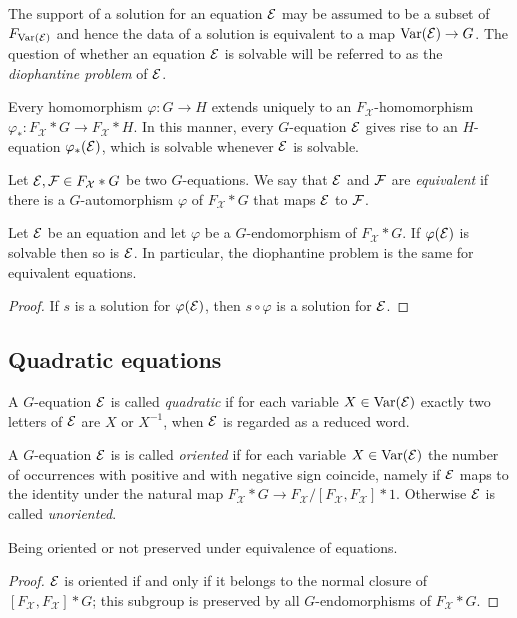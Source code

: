 \documentclass[a4paper,11pt]{amsart}
\begin{document}
The support of a solution for an equation $\mathcal{E}$ may be assumed to be
a subset of $F_{\textup{Var}(\mathcal{E})}$ and hence the data of a solution
is equivalent to a map $\textup{Var}(\mathcal{E}) \to G$.  The question of whether an
equation $\mathcal{E}$ is solvable will be referred to as the \emph{diophantine
problem} of $\mathcal{E}$.

Every homomorphism $\varphi \colon G \to H$ extends uniquely to an
$F_{\mathcal{X}}$-ho\-mo\-morphism $\varphi_* \colon F_{\mathcal{X}}*G \to F_{\mathcal{X}}*H$. In this manner,
every $G$-equation $\mathcal{E}$ gives rise to an $H$-equation $\varphi_*(\mathcal{E})$,
which is solvable whenever $\mathcal{E}$ is solvable.

\begin{defi}
  Let $\mathcal{E},\mathcal{F}\in F_{\mathcal{X}}* G$ be two $G$-equations. We say that $\mathcal{E}$ and $\mathcal{F}$ are
  \emph{equivalent} if there is a $G$-automorphism $\varphi$ of
  $F_{\mathcal{X}}*G$ that maps $\mathcal{E}$ to $\mathcal{F}$.
\end{defi}
\begin{lem}
  Let $\mathcal{E}$ be an equation and let $\varphi$ be a $G$-endomorphism of
  $F_{\mathcal{X}}*G$. If $\varphi(\mathcal{E})$ is solvable then so is $\mathcal{E}$. In particular,
  the diophantine problem is the same for equivalent equations.
\end{lem}
\begin{proof}
  If $s$ is a solution for $\varphi(\mathcal{E})$, then $s\circ\varphi$ is a
  solution for $\mathcal{E}$.
\end{proof}

\subsection{Quadratic equations}
A $G$-equation $\mathcal{E}$ is called \emph{quadratic} if for each variable
$X\in \textup{Var}(\mathcal{E})$ exactly two letters of $\mathcal{E}$ are $X$ or $X^{-1}$, when
$\mathcal{E}$ is regarded as a reduced word.

A $G$-equation $\mathcal{E}$ is is called \emph{oriented} if for each variable
$X\in \textup{Var}(\mathcal{E})$ the number of occurrences with positive and with
negative sign coincide, namely if $\mathcal{E}$ maps to the identity under the
natural map $F_{\mathcal{X}}*G\to F_{\mathcal{X}}/[F_{\mathcal{X}},F_{\mathcal{X}}]*1$.  Otherwise $\mathcal{E}$ is called
\emph{unoriented}.
\begin{lem}
 Being oriented or not preserved under equivalence of equations.
\end{lem}
\begin{proof}
  $\mathcal{E}$ is oriented if and only if it belongs to the normal closure of
  $[F_{\mathcal{X}},F_{\mathcal{X}}]*G$; this subgroup is preserved by all $G$-endomorphisms
  of $F_{\mathcal{X}}*G$.
\end{proof}
\end{document}
